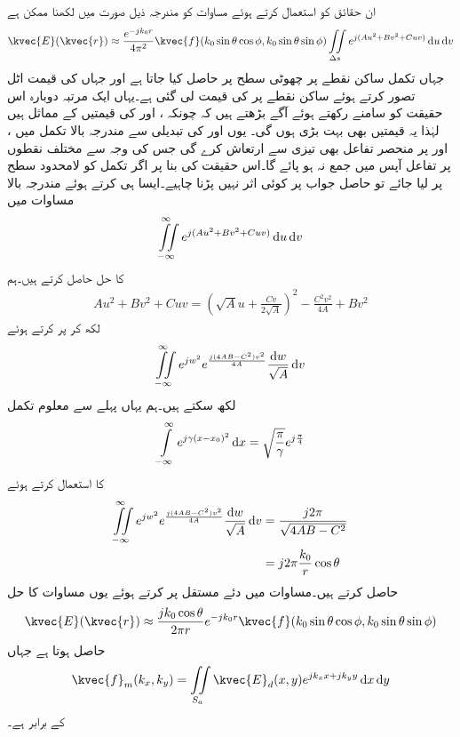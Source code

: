 ان حقائق کو استعمال کرتے ہوئے مساوات  کو مندرجہ ذیل صورت میں لکھنا ممکن ہے
\begin{align}
\kvec{E}(\kvec{r}) \approx \frac{e^{-jk_0 r}}{4\pi^2}\kvec{f}(k_0 \sin \theta \cos \phi,k_0 \sin\theta\sin\phi)\iint \limits_{\Delta s} e^{j (A u^2+ B v^2+C uv)} \dif u \dif v
\end{align}
جہاں تکمل  ساکن نقطے پر چھوٹی سطح  پر حاصل کیا جاتا ہے اور جہاں  کی قیمت اٹل تصور کرتے ہوئے ساکن نقطے پر  کی قیمت لی گئی ہے۔یہاں ایک مرتبہ دوبارہ اس حقیقت کو سامنے رکھتے ہوئے آگے بڑھتے ہیں کہ چونکہ ،  اور  کی قیمتیں  کے مماثل ہیں لہٰذا یہ قیمتیں بھی بہت بڑی ہوں گی۔ یوں  اور  کی تبدیلی سے مندرجہ بالا تکمل میں ،  اور  پر منحصر تفاعل بھی تیزی سے ارتعاش کرے گی جس کی وجہ سے مختلف نقطوں پر تفاعل آپس میں جمع نہ ہو پائے گا۔اس حقیقت کی بنا پر اگر تکمل کو لامحدود سطح پر لیا جائے تو حاصل جواب پر کوئی اثر نہیں پڑنا چاہیے۔ایسا ہی کرتے ہوئے مندرجہ بالا مساوات میں
\begin{align}
\iint \limits_{-\infty}^{\infty} e^{j (A u^2+ B v^2+C uv)} \dif u \dif v
\end{align}
کا حل حاصل کرتے ہیں۔ہم
\begin{align*}
A u^2+Bv^2+Cuv=\left(\sqrt{A} u +\frac{C v}{2\sqrt{A}} \right)^2-\frac{C^2 v^2}{4A}+Bv^2
\end{align*}
لکھ کر  پر کرتے ہوئے
\begin{align}
\iint \limits_{-\infty}^{\infty} e^{j w^2}e^{\frac{j(4AB-C^2)v^2}{4A}} \frac{\dif w}{\sqrt{A}} \dif v
\end{align}
لکھ سکتے ہیں۔ہم یہاں پہلے سے معلوم تکمل
\begin{align}
\int\limits_{-\infty}^{\infty}e^{j \gamma(x-x_0)^2} \dif x=\sqrt{\frac{\pi}{\gamma}} e^{j \frac{\pi}{4}}
\end{align}
کا استعمال کرتے ہوئے
 \begin{align*}
\iint \limits_{-\infty}^{\infty} e^{j w^2}e^{\frac{j(4AB-C^2)v^2}{4A}} \frac{\dif w}{\sqrt{A}} \dif v&=\frac{j 2\pi}{\sqrt{4AB-C^2}}\\
&=j 2\pi \frac{k_0}{r}\cos \theta
\end{align*}
حاصل کرتے ہیں۔مساوات  میں دئے مستقل پر کرتے ہوئے یوں مساوات  کا حل 
\begin{align}\label{مساوات_اینٹینا_فوریئر_بدل}
\kvec{E}(\kvec{r})\approx \frac{j k_0 \cos \theta}{2\pi r} e^{-j k_0 r}\kvec{f}(k_0 \sin \theta \cos \phi,k_0 \sin\theta \sin\phi)
\end{align}
حاصل ہوتا ہے جہاں
\begin{align}
\kvec{f}_m(k_x,k_y)=\iint\limits_{S_a} \kvec{E}_d(x,y) e^{j k_x x +j k_y y} \dif x \dif y
\end{align}
کے برابر ہے۔

